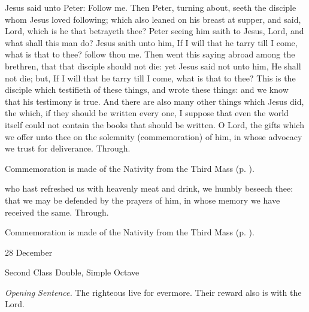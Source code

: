  Jesus said unto Peter: Follow me. Then Peter, turning about, seeth the disciple whom Jesus loved following; which also leaned on his breast at supper, and said, Lord, which is he that betrayeth thee? Peter seeing him saith to Jesus, Lord, and what shall this man do? Jesus saith unto him, If I will that he tarry till I come, what is that to thee? follow thou me. Then went this saying abroad among the brethren, that that disciple should not die: yet Jesus said not unto him, He shall not die; but, If I will that he tarry till I come, what is that to thee? This is the disciple which testifieth of these things, and wrote these things: and we know that his testimony is true. And there are also many other things which Jesus did, the which, if they should be written every one, I suppose that even the world itself could not contain the books that should be written.
\secret
{} O Lord, the gifts which we offer unto thee on the solemnity (commemoration) of him, in whose advocacy we trust for deliverance. Through.
\begin{rubric}
    Commemoration is made of the Nativity from the Third Mass (p. \pageref{NativityMassIII}).
\end{rubric}
\postcommunion
{} who hast refreshed us with heavenly meat and drink, we humbly beseech thee: that we may be defended by the prayers of him, in whose memory we have received the same. Through.
\begin{rubric}
    Commemoration is made of the Nativity from the Third Mass (p. \pageref{NativityMassIII}).
\end{rubric}


\begin{inhead}
{28 December}\par
{Second Class Double, Simple Octave}
\end{inhead}
\par\noindent
\textit{Opening Sentence.} The righteous live for evermore. Their reward also is with the Lord.

